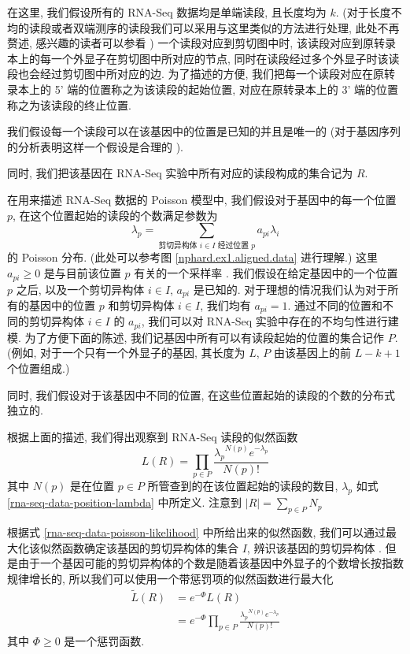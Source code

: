 在这里, 我们假设所有的 RNA-Seq 数据均是单端读段, 且长度均为 $k$. 
(对于长度不均的读段或者双端测序的读段我们可以采用与这里类似的方法进行处理, 
此处不再赘述, 感兴趣的读者可以参看 ) 
一个读段对应到剪切图中时, 该读段对应到原转录本上的每一个外显子在剪切图中所对应的节点, 
同时在读段经过多个外显子时该读段也会经过剪切图中所对应的边. 
为了描述的方便, 我们把每一个读段对应在原转录本上的 5' 端的位置称之为该读段的起始位置, 
对应在原转录本上的 3' 端的位置称之为该读段的终止位置. 

我们假设每一个读段可以在该基因中的位置是已知的并且是唯一的 
(对于基因序列的分析表明这样一个假设是合理的 \cite{peng2011t}). 

同时, 我们把该基因在 RNA-Seq 实验中所有对应的读段构成的集合记为 $R$. 

在用来描述 RNA-Seq 数据的 Poisson 模型中, 
我们假设对于基因中的每一个位置 $p$, 
在这个位置起始的读段的个数满足参数为 
\begin{equation}
\label{rna-seq-data-position-lambda}
\lambda_p = \sum_{\text{剪切异构体 $i \in I$ 经过位置 $p$}} a_{pi} \lambda_i
\end{equation}
的 Poisson 分布. (此处可以参考图 \ref{nphard.ex1.aligned.data} 进行理解.)
这里 $a_{pi} \geq 0$ 是与目前该位置 $p$ 有关的一个采样率 \cite{2011arXiv1106.3211S}. 
我们假设在给定基因中的一个位置 $p$ 之后, 以及一个剪切异构体 $i \in I$, 
$a_{pi}$ 是已知的. 
对于理想的情况我们认为对于所有的基因中的位置 $p$ 和剪切异构体 $i\in I$, 
我们均有 $a_{pi}=1$. 
通过不同的位置和不同的剪切异构体 $i\in I$ 的 $a_{pi}$, 
我们可以对 RNA-Seq 实验中存在的不均匀性进行建模. 
为了方便下面的陈述, 我们记基因中所有可以有读段起始的位置的集合记作 $P$. 
(例如, 对于一个只有一个外显子的基因, 其长度为 $L$, 
$P$ 由该基因上的前 $L-k+1$ 个位置组成.)

同时, 我们假设对于该基因中不同的位置, 
在这些位置起始的读段的个数的分布式独立的. 

根据上面的描述, 我们得出观察到 RNA-Seq 读段的似然函数
\begin{equation}
\label{rna-seq-data-poisson-likelihood}
L(R)= \prod_{p\in P} \frac{{\lambda_p}^{N(p)} e^{-\lambda_p}}{N(p)!}
\end{equation}
其中 $N(p)$ 是在位置 $p\in P$ 所管查到的在该位置起始的读段的数目, 
$\lambda_p$ 如式 \eqref{rna-seq-data-position-lambda} 中所定义. 
注意到 $|R|=\sum_{p\in P}N_p$

根据式 \eqref{rna-seq-data-poisson-likelihood} 中所给出来的似然函数, 
我们可以通过最大化该似然函数确定该基因的剪切异构体的集合 $I$, 
辨识该基因的剪切异构体 \cite{xing2006expectation}. 
但是由于一个基因可能的剪切异构体的个数是随着该基因中外显子的个数增长按指数规律增长的, 
所以我们可以使用一个带惩罚项的似然函数进行最大化
\begin{align}
\tilde{L}(R) &= e^{-\Phi} L(R) \nonumber \\ 
\label{rna-seq-data-poisson-penalized-likelihood}
&= e^{-\Phi} \prod_{p\in P} \frac{{\lambda_p}^{N(p)} e^{-\lambda_p}}{N(p)!}
\end{align}
其中 $\Phi \geq 0$ 是一个惩罚函数. 

